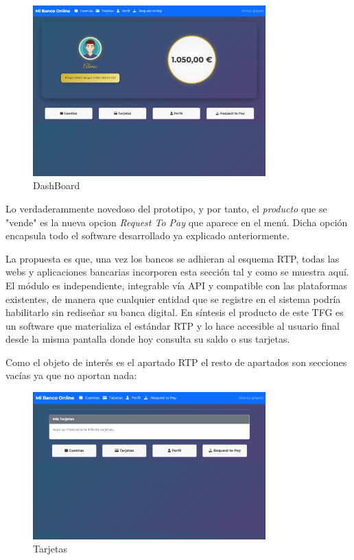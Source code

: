 \begin{figure}[H]
  \centering
  \includegraphics[width=0.8\textwidth]{Imagenes/DashBoard.png}
  \caption{DashBoard}
  \label{fig:DashBoard}
\end{figure}

Lo verdaderammente novedoso del prototipo, y por tanto, el \emph{producto} que se "vende" es la nueva opcion \emph{Request To Pay} que aparece en el menú. Dicha opción encapsula todo el software desarrollado ya explicado anteriormente.

La propuesta es que, una vez los bancos se adhieran al esquema RTP, todas las webs y aplicaciones bancarias incorporen esta sección tal y como se muestra aquí. El módulo es independiente, integrable vía API y compatible con las plataformas existentes, de manera que cualquier entidad que se registre en el sistema podría habilitarlo sin rediseñar su banca digital. En síntesis el producto de este TFG es un software que materializa el estándar RTP y lo hace accesible al usuario final desde la misma pantalla donde hoy consulta su saldo o sus tarjetas.

Como el objeto de interés es el apartado RTP el resto de apartados son secciones vacías ya que no aportan nada:

\begin{figure}[H]
  \centering
  \includegraphics[width=0.8\textwidth]{Imagenes/Tarjetas.png}
  \caption{Tarjetas}
  \label{fig:Tarjetas}
\end{figure}

